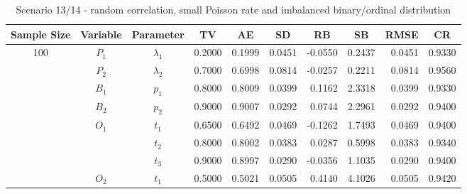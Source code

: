 \documentclass[letterpaper]{article}
\begin{document}
\begin{table}[h]
\centering
\caption{Scenario 13/14 - random correlation, small Poisson rate and imbalanced binary/ordinal distribution}
\begin{tabular}{cccrrrrrrr}
\hline
Sample Size & Variable    & Parameter      & \multicolumn{1}{c}{TV} & \multicolumn{1}{c}{AE} & \multicolumn{1}{c}{SD} & \multicolumn{1}{c}{RB} & \multicolumn{1}{c}{SB} & \multicolumn{1}{c}{RMSE} & \multicolumn{1}{c}{CR} \\\hline
100         & $P_1$       & $\lambda_1$    & 0.2000                 & 0.1999                 & 0.0451                 & -0.0550                & 0.2437                 & 0.0451                   & 0.9330                 \\
            & $P_2$       & $\lambda_2$    & 0.7000                 & 0.6998                 & 0.0814                 & -0.0257                & 0.2211                 & 0.0814                   & 0.9560                 \\
            & $B_1$       & $p_1$          & 0.8000                 & 0.8009                 & 0.0399                 & 0.1162                 & 2.3318                 & 0.0399                   & 0.9330                 \\
            & $B_2$       & $p_2$          & 0.9000                 & 0.9007                 & 0.0292                 & 0.0744                 & 2.2961                 & 0.0292                   & 0.9400                 \\
            & $O_1$       & $t_1$          & 0.6500                 & 0.6492                 & 0.0469                 & -0.1262                & 1.7493                 & 0.0469                   & 0.9400                 \\
            &             & $t_2$          & 0.8000                 & 0.8002                 & 0.0383                 & 0.0287                 & 0.5998                 & 0.0383                   & 0.9340                 \\
            &             & $t_3$          & 0.9000                 & 0.8997                 & 0.0290                 & -0.0356                & 1.1035                 & 0.0290                   & 0.9400                 \\
            & $O_2$       & $t_1$          & 0.5000                 & 0.5021                 & 0.0505                 & 0.4140                 & 4.1026                 & 0.0505                   & 0.9420                 \\

\end{tabular}
\end{table}
\end{document}
